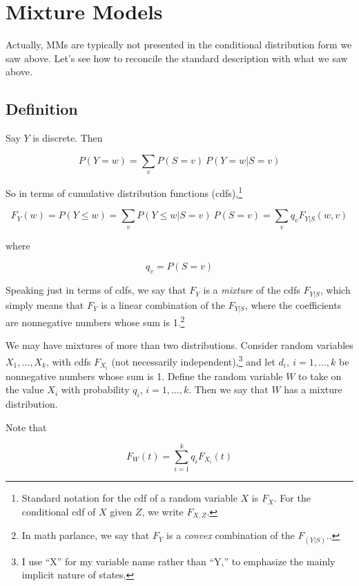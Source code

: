 \documentclass[11pt]{article}
\begin{document}
\section{Mixture Models}

Actually, MMs are typically not presented in the conditional distribution
form we saw above.  Let's see how to reconcile the standard description
with what we saw above.

\subsection{Definition}
\label{mixdef}

Say $Y$ is discrete.  Then

\begin{equation}
P(Y = w) = \sum_{v} P(S = v) ~ P(Y = w | S = v)
\end{equation}

So in terms of cumulative distribution functions
(cdfs),\footnote{Standard notation for the cdf of a random variable $X$
is $F_X$.  For the conditional cdf of $X$ given $Z$, we write
$F_{X,Z}$.}

\begin{equation}
\label{mixedFs}
F_Y(w) = P(Y \leq w) = 
\sum_{v} P(Y \leq w | S = v) ~ P(S = v) =
\sum_{v} q_v F_{Y|S}(w,v)
\end{equation}

where 

\begin{equation}
q_v = P(S = v)
\end{equation}

Speaking just in terms of cdfs, we say that $F_Y$ is a \textit{mixture}
of the cdfs $F_{Y|S}$, which simply means that $F_Y$ is a linear
combination of the $F_{Y|S}$, where the coefficients are nonnegative
numbers whose sum is 1.\footnote{In math parlance, we say that $F_Y$ is
a \textit{convex} combination of the $F_{(Y|S)}$..}

We may have mixtures of more than two distributions.  Consider random
variables $X_1,...,X_k$, with cdfs $F_{X_i}$ (not necessarily
independent),\footnote{I use ``X'' for my variable name rather than
``Y,'' to emphasize the mainly implicit nature of states.} and let $d_i,
~ i=1,...,k$ be nonnegative numbers whose sum is 1.  Define the random
variable $W$ to take on the value $X_i$ with probability $q_i$,
$i=1,...,k$.  Then we say that $W$ has a mixture distribution.  

Note that

\begin{equation}
F_{W}(t) = \sum_{i=1}^k q_i F_{X_i}(t)
\end{equation}
\end{document}
